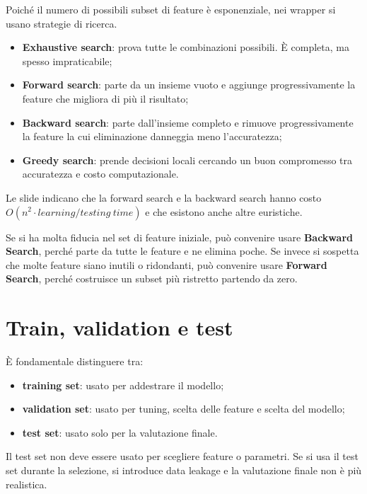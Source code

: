 Poiché il numero di possibili subset di feature è esponenziale, nei wrapper si usano strategie di ricerca.

\begin{itemize}
    \item \textbf{Exhaustive search}: prova tutte le combinazioni possibili. È completa, ma spesso impraticabile;
    \item \textbf{Forward search}: parte da un insieme vuoto e aggiunge progressivamente la feature che migliora di più il risultato;
    \item \textbf{Backward search}: parte dall'insieme completo e rimuove progressivamente la feature la cui eliminazione danneggia meno l'accuratezza;
    \item \textbf{Greedy search}: prende decisioni locali cercando un buon compromesso tra accuratezza e costo computazionale.
\end{itemize}

\begin{notaslide}
Le slide indicano che la forward search e la backward search hanno costo \(O(n^2 \cdot learning/testing\ time)\) e che esistono anche altre euristiche.
\end{notaslide}

\begin{notaesame}
Se si ha molta fiducia nel set di feature iniziale, può convenire usare \textbf{Backward Search}, perché parte da tutte le feature e ne elimina poche. Se invece si sospetta che molte feature siano inutili o ridondanti, può convenire usare \textbf{Forward Search}, perché costruisce un subset più ristretto partendo da zero.
\end{notaesame}

\section{Train, validation e test}

È fondamentale distinguere tra:

\begin{itemize}
    \item \textbf{training set}: usato per addestrare il modello;
    \item \textbf{validation set}: usato per tuning, scelta delle feature e scelta del modello;
    \item \textbf{test set}: usato solo per la valutazione finale.
\end{itemize}

\begin{notaesame}
Il test set non deve essere usato per scegliere feature o parametri. Se si usa il test set durante la selezione, si introduce data leakage e la valutazione finale non è più realistica.
\end{notaesame}

